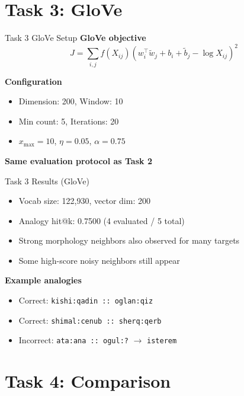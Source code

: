 \documentclass{beamer}
\begin{document}
\section{Task 3: GloVe}

\begin{frame}{Task 3 GloVe Setup}
\small
\textbf{GloVe objective}
\[
J=\sum_{i,j} f(X_{ij})\left(w_i^\top \tilde{w}_j + b_i + \tilde{b}_j - \log X_{ij}\right)^2
\]

\vspace{0.4em}
\textbf{Configuration}
\begin{itemize}
  \item Dimension: 200, Window: 10
  \item Min count: 5, Iterations: 20
  \item \(x_{\max}=10\), \(\eta=0.05\), \(\alpha=0.75\)
\end{itemize}

\textbf{Same evaluation protocol as Task 2}
\end{frame}

\begin{frame}{Task 3 Results (GloVe)}
\small
\begin{itemize}
  \item Vocab size: 122,930, vector dim: 200
  \item Analogy hit@k: 0.7500 (4 evaluated / 5 total)
  \item Strong morphology neighbors also observed for many targets
  \item Some high-score noisy neighbors still appear
\end{itemize}

\vspace{0.3em}
\textbf{Example analogies}
\begin{itemize}
  \item Correct: \texttt{kishi:qadin :: oglan:qiz}
  \item Correct: \texttt{shimal:cenub :: sherq:qerb}
  \item Incorrect: \texttt{ata:ana :: ogul:?} $\rightarrow$ \texttt{isterem}
\end{itemize}
\end{frame}

\section{Task 4: Comparison}
\end{document}

